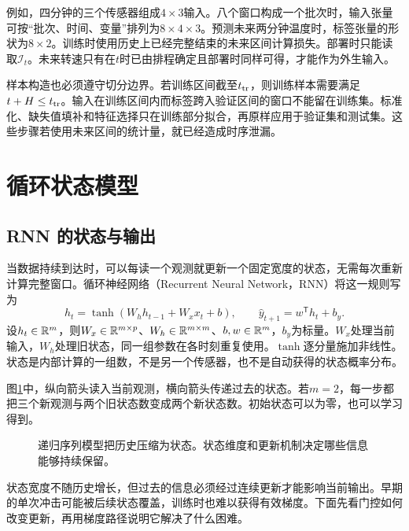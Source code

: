 例如，四分钟的三个传感器组成$4\times3$输入。八个窗口构成一个批次时，输入张量可按“批次、时间、变量”排列为$8\times4\times3$。预测未来两分钟温度时，标签张量的形状为$8\times2$。训练时使用历史上已经完整结束的未来区间计算损失。部署时只能读取$\mathcal I_t$。未来转速只有在$t$时已由排程确定且部署时同样可得，才能作为外生输入。

样本构造也必须遵守切分边界。若训练区间截至$t_{\rm tr}$，则训练样本需要满足$t+H\leq t_{\rm tr}$。输入在训练区间内而标签跨入验证区间的窗口不能留在训练集。标准化、缺失值填补和特征选择只在训练部分拟合，再原样应用于验证集和测试集。这些步骤若使用未来区间的统计量，就已经造成时序泄漏。

\section{循环状态模型}
\subsection{RNN 的状态与输出}
当数据持续到达时，可以每读一个观测就更新一个固定宽度的状态，无需每次重新计算完整窗口。循环神经网络（Recurrent Neural Network，RNN）将这一规则写为
\begin{equation}
 h_t=\tanh(W_hh_{t-1}+W_xx_t+b),\qquad
 \hat y_{t+1}=w^{\mathsf T}h_t+b_y.
 \label{eq:sequence-rnn-predict}
\end{equation}
设$h_t\in\mathbb{R}^m$，则$W_x\in\mathbb{R}^{m\times p}$、$W_h\in\mathbb{R}^{m\times m}$、$b,w\in\mathbb{R}^m$，$b_y$为标量。$W_x$处理当前输入，$W_h$处理旧状态，同一组参数在各时刻重复使用。$\tanh$逐分量施加非线性。状态是内部计算的一组数，不是另一个传感器，也不是自动获得的状态概率分布。

图\ref{fig:sequence-recurrent-state}中，纵向箭头读入当前观测，横向箭头传递过去的状态。若$m=2$，每一步都把三个新观测与两个旧状态数变成两个新状态数。初始状态可以为零，也可以学习得到。

\begin{figure}[htbp]
\centering
{}
\caption{递归序列模型把历史压缩为状态。状态维度和更新机制决定哪些信息能够持续保留。}
\label{fig:sequence-recurrent-state}
\end{figure}
状态宽度不随历史增长，但过去的信息必须经过连续更新才能影响当前输出。早期的单次冲击可能被后续状态覆盖，训练时也难以获得有效梯度。下面先看门控如何改变更新，再用梯度路径说明它解决了什么困难。

